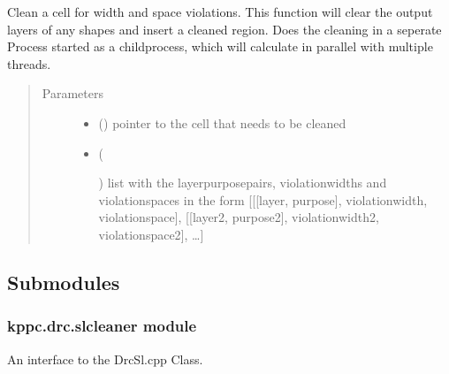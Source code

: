 \documentclass[a4paper,10pt,english]{sphinxmanual}
\begin{document}
\begin{fulllineitems}
\label{\detokenize{drc/drc:kppc.drc.multiprocessing_clean}}
Clean a cell for width and space violations.
This function will clear the output layers of any shapes and insert a cleaned region.
Does the cleaning in a seperate Process started as a childprocess,
which will calculate in parallel with multiple threads.
\begin{quote}\begin{description}
\item[{Parameters}] \leavevmode\begin{itemize}
\item {} 
 () \textendash{} pointer to the cell that needs to be cleaned

\item {} 
 (%
\begin{footnote}[6]\sphinxAtStartFootnote
{}
%
\end{footnote}) \textendash{} list with the layerpurposepairs, violationwidths and violationspaces in the form {[}{[}{[}layer,
purpose{]}, violationwidth, violationspace{]}, {[}{[}layer2, purpose2{]}, violationwidth2, violationspace2{]}, …{]}

\end{itemize}

\end{description}\end{quote}

\end{fulllineitems}



\subsection{Submodules}
\label{\detokenize{drc/drc:submodules}}

\subsubsection{kppc.drc.slcleaner module}
\label{\detokenize{drc/drc:kppc-drc-slcleaner-module}}\label{\detokenize{drc/drc:slcleaner}}
An interface to the DrcSl.cpp Class.
\end{document}
